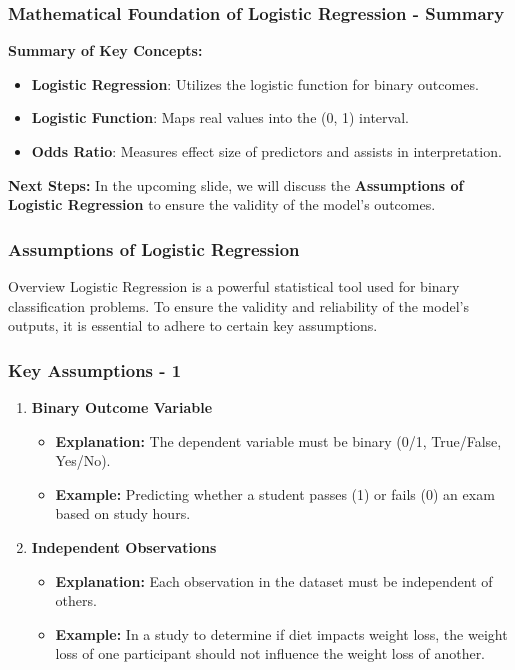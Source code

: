 \documentclass[aspectratio=169]{beamer}
\begin{document}
\begin{frame}[fragile]
    \frametitle{Mathematical Foundation of Logistic Regression - Summary}
    
    \textbf{Summary of Key Concepts:}
    \begin{itemize}
        \item \textbf{Logistic Regression}: Utilizes the logistic function for binary outcomes.
        \item \textbf{Logistic Function}: Maps real values into the (0, 1) interval.
        \item \textbf{Odds Ratio}: Measures effect size of predictors and assists in interpretation.
    \end{itemize}

    \textbf{Next Steps:}
    In the upcoming slide, we will discuss the \textbf{Assumptions of Logistic Regression} to ensure the validity of the model's outcomes.
\end{frame}

\begin{frame}[fragile]
    \frametitle{Assumptions of Logistic Regression}
    \begin{block}{Overview}
        Logistic Regression is a powerful statistical tool used for binary classification problems. To ensure the validity and reliability of the model's outputs, it is essential to adhere to certain key assumptions.
    \end{block}
\end{frame}

\begin{frame}[fragile]
    \frametitle{Key Assumptions - 1}
    \begin{enumerate}
        \item \textbf{Binary Outcome Variable}
        \begin{itemize}
            \item \textbf{Explanation:} The dependent variable must be binary (0/1, True/False, Yes/No).
            \item \textbf{Example:} Predicting whether a student passes (1) or fails (0) an exam based on study hours.
        \end{itemize}

        \item \textbf{Independent Observations}
        \begin{itemize}
            \item \textbf{Explanation:} Each observation in the dataset must be independent of others.
            \item \textbf{Example:} In a study to determine if diet impacts weight loss, the weight loss of one participant should not influence the weight loss of another.
        \end{itemize}
    \end{enumerate}
\end{frame}
\end{document}
